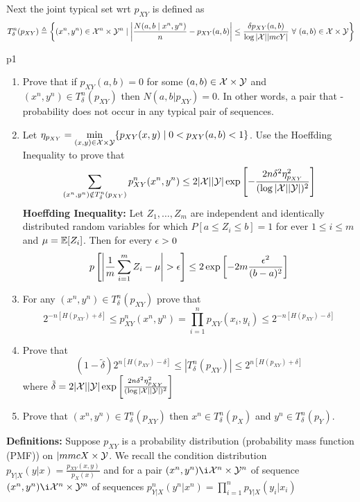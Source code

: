 \documentclass[a4paper, 11pt]{article}
\begin{document}
 Next the joint typical set wrt $p_{XY}$ is defined as $$T_{\delta}^n(p_{XY})\triangleq \left\{ (x^n,y^n)\in \mathcal{X}^n\times \mathcal{Y}^n\mid \left|\frac{N(a,b\mid x^n,y^n)}{n}-p_{XY}(a,b)  \right| \leq \frac{\delta p_{XY}(a,b)}{\log |\mathcal{X}||mcY|}\ \forall \ (a,b)\in \mathcal{X}\times \mathcal{Y}\right\}$$
\begin{problem}{%
}{p1%
}
\begin{enumerate}
	\item Prove that if $p_{XY}(a,b)=0$ for some $(a,b)\in \mathcal{X}\times \mathcal{Y}$ and $(x^n,y^n)\in T_{\delta}^n(p_{XY})$ then $N(a,b|p_{XY})=0$. In other words, a pair that - probability does not occur in any typical pair of sequences.
	\item Let $\eta_{p_{XY}}=\min\limits_{(x,y)\in \mathcal{X}\times \mathcal{Y}}\{p_{XY}(x,y)\mid 0<p_{XY}(a,b)<1\}$. Use the Hoeffding Inequality to prove that $$\sum_{(x^n,y^n)\notin T_{\delta}^n(p_{XY})}p_{XY}^n(x^n,y^n)\leq 2|\mathcal{X}||\mathcal{Y}|\exp\left[- \frac{2n\delta^2\eta^2_{p_{XY}}}{(\log |\mathcal{X}||\mathcal{Y}|)^2}  \right]$$
	\textbf{Hoeffding Inequality:} Let $Z_1,\dots, Z_m$ are independent and identically distributed random variables for which $P[a\leq Z_i\leq b]=1$ for ever $1\leq i\leq m$ and $\mu=\mathbb{E}[Z_i]$. Then for every $\epsilon>0$ $$p\lt[\lt| \frac1m\sum_{i=1}^mZ_i-\mu \rt|>\eps\rt]\leq 2\exp\lt[ -2m\frac{\eps^2}{(b-a)^2}\rt ]$$
	\item For any $(x^n,y^n)\in T_{\delta}^n(p_{XY})$ prove that $$2^{-n[H(p_{XY})+\delta]}\leq p_{XY}^n(x^n,y^n)=\prod_{i=1}^np_{XY}(x_i,y_i)\leq 2^{-n[H(p_{XY})-\delta]}$$
	\item Prove that $$(1-\tilde{\delta})2^{n[H(p_{XY})-\delta]}\leq |T_{\delta}^n(p_{XY})|\leq 2^{n[H(p_{XY})+\delta]}$$ where $\tilde{\delta}=2|\mathcal{X}||\mathcal{Y}|\exp\left[  \frac{2n\delta^2\eta^2_{p_{XY}}}{(\log |\mathcal{X}||\mathcal{Y}|)^2}   \right]$
	\item Prove that $(x^n,y^n)\in T_{\delta}^n(p_{XY})$ then $x^n\in T_{\delta}^n (p_X)$ and $y^n\in T_{\delta}^n(p_Y)$.
\end{enumerate}
\end{problem}


\solve{
}
 \parinf \textbf{Definitions:} Suppose $p_{XY}$ is a probability distribution (probability mass function (PMF)) on $|mmcX\times \mathcal{Y}$. We recall the condition distribution $p_{Y|X}(y|x)=\frac{p_{XY}(x,y)}{p_X(x)}$ and  for a pair $(x^n,y^n)\i \mcX^n\times \mcY^n$ of sequence $(x^n,y^n)\i \mcX^n\times \mcY^n$ of sequences $p_{Y|X}^n(y^n|x^n)=\prod\limits_{i=1}^np_{Y|X}(y_i|x_i)$\parinn
 	
\end{document}
